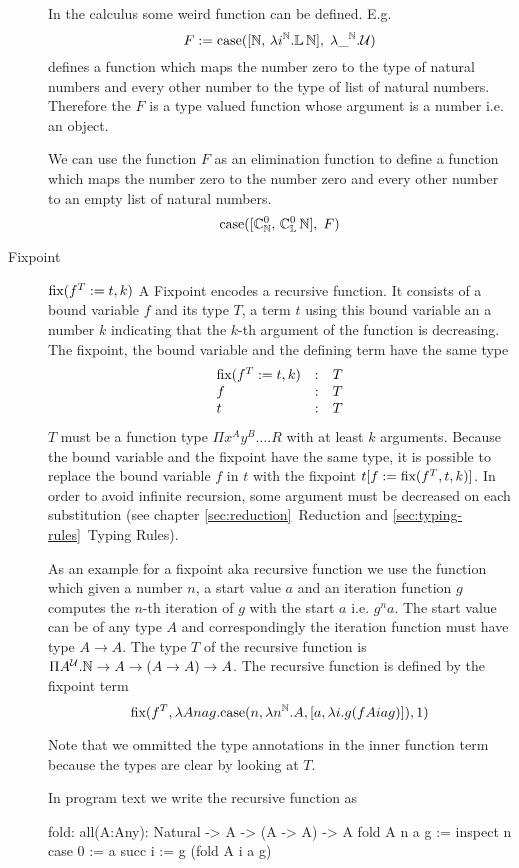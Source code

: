 \begin{description}
    {\def\Nat{\mathbb{N}} \def\List{\mathbb{L}}

        In the calculus some weird function can be defined. E.g.
        $$
        F :=
        \case(
            [\Nat,\, \lambda i^\Nat. \List\, \Nat],\;
            \lambda \_^\Nat. \Any
        )
        $$
        defines a function which maps the number zero to the type of natural numbers
        and every other number to the type of list of natural numbers. Therefore the
        $F$ is a type valued function whose argument is a number i.e. an
        object.

        We can use the function $F$ as an elimination function to define a
        function which maps the number zero to the number zero and every other
        number to an empty list of natural numbers.
        $$
        \case([\Constructor^0_\Nat,\, \Constructor^0_\List\, \Nat],\; F)
        $$
    }


\item[Fixpoint] $\text{fix}(f^T := t, k)$ A Fixpoint encodes a recursive function. It
  consists of a bound variable $f$ and its type $T$, a term $t$ using this
  bound variable an a number $k$ indicating that the $k$-th argument of the
  function is decreasing. The fixpoint, the bound variable and the defining term
  have the same type
  $$
  \begin{array}{lll}
    \text{fix}(f^T := t, k) &:& T
    \\
    f &:& T
    \\
    t &:& T
  \end{array}
  $$
  $T$ must be a function type $\Pi x^A y^B \ldots . R$ with at least $k$
  arguments. Because the bound variable and the fixpoint have the same type,
  it is possible to replace the bound variable $f$ in $t$ with the fixpoint
  $t[f := \text{fix}(f^T, t, k)]$. In order to avoid infinite recursion, some
  argument must be decreased on each substitution (see chapter
  \ref{sec:reduction}~Reduction and \ref{sec:typing-rules}~Typing Rules).

  { \def\Nat{\mathbb{N}}

    As an example for a fixpoint aka recursive function we use the function
    which given a number $n$, a start value $a$ and an iteration function $g$
    computes the $n$-th iteration of $g$ with the start $a$ i.e. $g^n a$. The
    start value can be of any type $A$ and correspondingly the iteration
    function must have type $A \to A$. The type $T$ of the recursive function
    is $\Pi A^\Any. \Nat \to A \to (A \to A) \to A$. The recursive function is
    defined by the fixpoint term
    $$
    \fix (
    f^T,
    \lambda A n a g.
      \case(n,
            \lambda n^\Nat. A,
            [a, \lambda i. g (f A i a g)]
      ),
      1)
    $$
  }%
  Note that we ommitted the type annotations in the inner function term
  because the types are clear by looking at $T$.

  In program text we write the recursive function as
  \begin{alba}
    fold: all(A:Any): Natural -> A -> (A -> A) -> A
    fold A n a g :=
       inspect n case
          0 := a
          succ i := g (fold A i a g)
  \end{alba}
\end{description}
